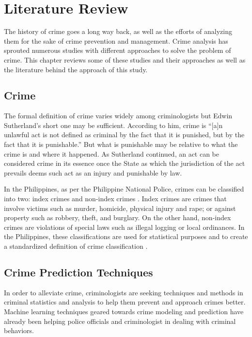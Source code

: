 \section{Literature Review}
    The history of crime goes a long way back, as well as the efforts of analyzing them for the sake of crime prevention and management. Crime analysis has sprouted numerous studies with different approaches to solve the problem of crime. This chapter reviews some of these studies and their approaches as well as the literature behind the approach of this study.
\subsection{Crime}
    The formal definition of crime varies widely among criminologists but Edwin Sutherland’s short one may be sufficient. According to him, crime is “[a]n unlawful act is not defined as criminal by the fact that it is punished, but by the fact that it is punishable.” \cite{brown2010criminology} But what is punishable may be relative to what the crime is and where it happened. As Sutherland continued, an act can be considered crime in its essence once the State as which the jurisdiction of the act prevails deems such act as an injury and punishable by law.

    In the Philippines, as per the Philippine National Police, crimes can be classified into two: index crimes and non-index crimes \cite{senate2013criminal}. Index crimes are crimes that involve victims such as murder, homicide, physical injury and rape; or against property such as robbery, theft, and burglary. On the other hand, non-index crimes are violations of special laws such as illegal logging or local ordinances. In the Philippines, these classifications are used for statistical purposes and to create a standardized definition of crime classification \cite{tumulak2015crime}.

\subsection{Crime Prediction Techniques}
    In order to alleviate crime, criminologists are seeking techniques and methods in criminal statistics and analysis to help them prevent and approach crimes better. Machine learning techniques geared towards crime modeling and prediction have already been helping police officials and criminologist in dealing with criminal behaviors.

